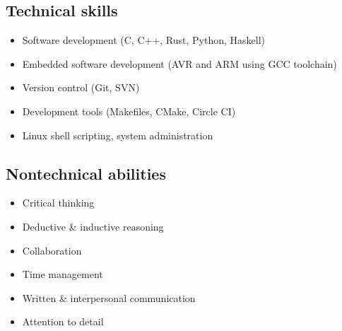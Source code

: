 
\vspace{-1.2em}

\begin{multicols}{2}
  \subsection*{Technical skills}

  \begin{itemize}
    \item Software development (C, C++, Rust, Python, Haskell)
    \item Embedded software development (AVR and ARM using GCC toolchain)
    \item Version control (Git, SVN)
    \item Development tools (Makefiles, CMake, Circle CI)
    \item Linux shell scripting, system administration
  \end{itemize}

  \vfill\null
  \columnbreak

  \subsection*{Nontechnical abilities}

  \begin{itemize}
    \item Critical thinking
    \item Deductive \& inductive reasoning
    \item Collaboration
    \item Time management
    \item Written \& interpersonal communication
    \item Attention to detail
  \end{itemize}

  \vfill\null
\end{multicols}
